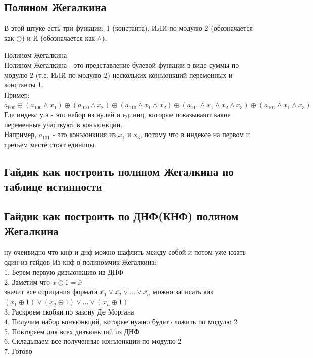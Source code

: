 \subsection{Полином Жегалкина}
В этой штуке есть три функции: 1 (константа), ИЛИ по модулю 2 (обозначается как $\oplus$) и И (обозначается как $\land$). \\
\begin{definition}
  {Полином Жегалкина} \\
  Полином Жегалкина - это представление булевой функции в виде суммы по модулю 2 (т.е. ИЛИ по модулю 2) нескольких конъюнкций переменных и константы 1. \\
  Пример: $a_{000} \oplus (a_{100} \land x_1) \oplus (a_{010} \land x_2) \oplus (a_{110} \land x_1 \land x_2) \oplus (a_{111} \land x_1 \land x_2 \land x_3) \oplus (a_{101} \land x_1 \land x_3)$
  Где индекс у а - это набор из нулей и единиц, которые показывают какие переменные участвуют в конъюнкции. \\
  Например, $a_{101}$ - это конъюнкция из $x_1$ и $x_3$, потому что в индексе на первом и третьем месте стоят единицы. \\
\end{definition}
\subsection*{Гайдик как построить полином Жегалкина по таблице истинности}

\subsection*{Гайдик как построить по ДНФ(КНФ) полином Жегалкина}
ну очеивидно что кнф и днф можно шафлить между собой и потом уже юзать один из гайдов
Из кнф в полиномчик Жегалкина: \\
1. Берем первую дизъюнкцию из ДНФ \\
2. Заметим что $x \oplus 1 = \overline{x}$ \\ значит все отрицания формата $\overline{x_1} \lor \overline{x_2} \lor ... \lor \overline{x_n}$ можно записать как $(x_1 \oplus 1) \lor (x_2 \oplus 1) \lor ... \lor (x_n \oplus 1)$ \\
3. Раскроем скобки по закону Де Моргана \\
4. Получим набор конъюнкций, которые нужно будет сложить по модулю 2 \\
5. Повторяем для всех дизъюнкций из ДНФ \\
6. Складываем все полученные конъюнкции по модулю 2 \\
7. Готово \\
